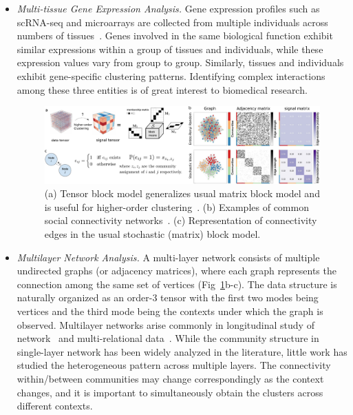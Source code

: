 \documentclass[11pt]{article}
\theoremstyle{exampstyle}
\theoremstyle{definition}
\begin{document}
\begin{itemize}[wide, labelwidth=!, labelindent=0pt,topsep=-7pt]
\item \emph{Multi-tissue Gene Expression Analysis.} Gene expression profiles such as scRNA-seq and microarrays are collected from multiple individuals across numbers of tissues~\cite{mele2015human,wang2019three}. Genes involved in the same biological function exhibit similar expressions within a group of tissues and individuals, while these expression values vary from group to group. Similarly, tissues and individuals exhibit gene-specific clustering patterns. Identifying complex interactions among these three entities is of great interest to biomedical research. 

 \begin{figure}[http]
\begin{center}
\includegraphics[width=1\textwidth]{network1.pdf}
\caption{(a) Tensor block model generalizes usual matrix block model and is useful for higher-order clustering~\cite{han2020exact}. (b) Examples of common social connectivity networks~\cite{faskowitz2018weighted}. (c) Representation of connectivity edges in the usual stochastic (matrix) block model.}\label{fig:1}
\end{center}
\vspace{-.2cm}
\end{figure}
   
\item \emph{Multilayer Network Analysis.} A multi-layer network consists of multiple undirected graphs (or adjacency matrices), where each graph represents the connection among the same set of vertices (Fig~\ref{fig:1}b-c). The data structure is naturally organized as an order-3 tensor with the first two modes being vertices and the third mode being the contexts under which the graph is observed. Multilayer networks arise commonly in longitudinal study of network~\cite{lei2019consistentcommunity} and multi-relational data~\cite{wang3, wang4}. While the community structure in single-layer network has been widely analyzed in the literature, little work has studied the heterogeneous pattern across multiple layers. The connectivity within/between communities may change correspondingly as the context changes, and it is important to simultaneously obtain the clusters across different contexts. 
    

\end{itemize}
\end{document}
